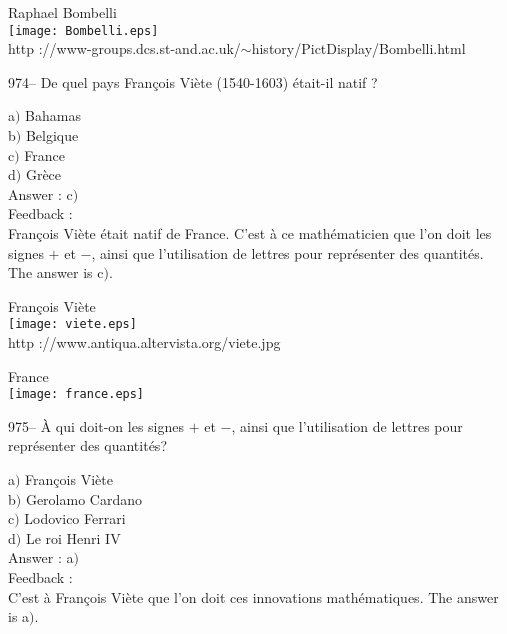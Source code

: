 ﻿\documentclass[letterpaper, 12pt]{article}
\begin{document}
        \begin{center}
        Raphael Bombelli\\
    \texttt{[image: Bombelli.eps]}\\
        {\footnotesize http
://www-groups.dcs.st-and.ac.uk/$\sim$history/PictDisplay/Bombelli.html}
    \end{center}

974-- De quel pays Fran\c cois Vi\`ete (1540-1603) \'etait-il natif
?

a$)$ Bahamas \\
b$)$ Belgique  \\
c$)$ France  \\
d$)$ Gr\`ece\\

Answer : c$)$\\

Feedback : \\
Fran\c cois Vi\`ete \'etait natif de France. C'est \`a ce
math\'ematicien que l'on doit les signes $+$ et $-$, ainsi que
l'utilisation de lettres
pour repr\'esenter des quantit\'es. The answer is c$)$.\\

        \begin{center}
        Fran\c cois Vi\`ete\\
    \texttt{[image: viete.eps]}\\
        {\footnotesize http ://www.antiqua.altervista.org/viete.jpg}
    \end{center}

        \begin{center}
        France\\
    \texttt{[image: france.eps]}\\
    \end{center}

975-- \`A qui doit-on les signes $+$ et $-$, ainsi que l'utilisation
de lettres pour repr\'esenter des quantit\'es?

a$)$ Fran\c cois Vi\`ete \\
b$)$ Gerolamo Cardano  \\
c$)$ Lodovico Ferrari  \\
d$)$ Le roi Henri IV\\

Answer : a$)$\\

Feedback : \\
C'est \`a Fran\c cois Vi\`ete que l'on doit ces innovations
math\'ematiques. The answer is a$)$.
\end{document}
